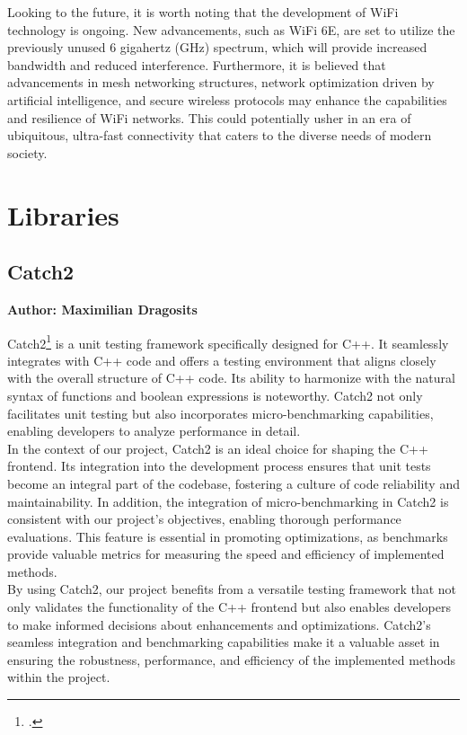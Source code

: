 Looking to the future, it is worth noting that the development of WiFi technology is ongoing. New advancements, such as WiFi 6E, are set to utilize the previously unused 6 gigahertz (GHz) spectrum, which will provide increased bandwidth and reduced interference. Furthermore, it is believed that advancements in mesh networking structures, network optimization driven by artificial intelligence, and secure wireless protocols may enhance the capabilities and resilience of WiFi networks. This could potentially usher in an era of ubiquitous, ultra-fast connectivity that caters to the diverse needs of modern society.


\section{Libraries}

\subsection{Catch2}
\textbf{Author: Maximilian Dragosits}

Catch2\footcite{catch2_git} is a unit testing framework specifically designed for C++. It seamlessly integrates with C++ code and offers a testing environment 
that aligns closely with the overall structure of C++ code. Its ability to harmonize with the natural syntax of functions and boolean expressions is noteworthy. 
Catch2 not only facilitates unit testing but also incorporates micro-benchmarking capabilities, enabling developers to analyze performance in detail.\\

In the context of our project, Catch2 is an ideal choice for shaping the C++ frontend. Its integration into the development process ensures that unit tests 
become an integral part of the codebase, fostering a culture of code reliability and maintainability. In addition, the integration of micro-benchmarking in Catch2 
is consistent with our project's objectives, enabling thorough performance evaluations. This feature is essential in promoting optimizations, as benchmarks provide 
valuable metrics for measuring the speed and efficiency of implemented methods.\\

By using Catch2, our project benefits from a versatile testing framework that not only validates the functionality of the C++ frontend but also enables developers 
to make informed decisions about enhancements and optimizations. Catch2's seamless integration and benchmarking capabilities make it a valuable asset in ensuring 
the robustness, performance, and efficiency of the implemented methods within the project.

